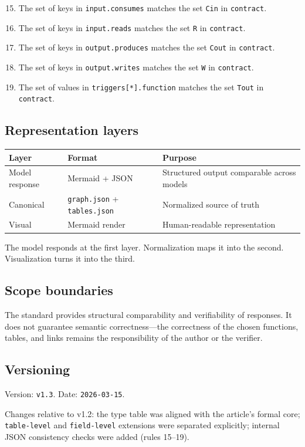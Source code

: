 \begin{enumerate}
\setcounter{enumi}{14}
\item The set of keys in \texttt{input.consumes} matches the set \texttt{Cin} in \texttt{contract}.
\item The set of keys in \texttt{input.reads} matches the set \texttt{R} in \texttt{contract}.
\item The set of keys in \texttt{output.produces} matches the set \texttt{Cout} in \texttt{contract}.
\item The set of keys in \texttt{output.writes} matches the set \texttt{W} in \texttt{contract}.
\item The set of values in \texttt{triggers[*].function} matches the set \texttt{Tout} in \texttt{contract}.
\end{enumerate}

\subsection{Representation layers}

\begin{tabular}{lll}
\hline
\textbf{Layer} & \textbf{Format} & \textbf{Purpose} \\
\hline
Model response & Mermaid + JSON & Structured output comparable across models \\
Canonical & \texttt{graph.json} + \texttt{tables.json} & Normalized source of truth \\
Visual & Mermaid render & Human-readable representation \\
\hline
\end{tabular}

\vspace{0.5em}
The model responds at the first layer. Normalization maps it into the second. Visualization turns it into the third.

\subsection{Scope boundaries}

The standard provides structural comparability and verifiability of responses. It does not guarantee semantic correctness---the correctness of the chosen functions, tables, and links remains the responsibility of the author or the verifier.

\subsection{Versioning}

Version: \texttt{v1.3}. Date: \texttt{2026-03-15}.

Changes relative to v1.2: the type table was aligned with the article's formal core; \texttt{table-level} and \texttt{field-level} extensions were separated explicitly; internal JSON consistency checks were added (rules 15--19).
